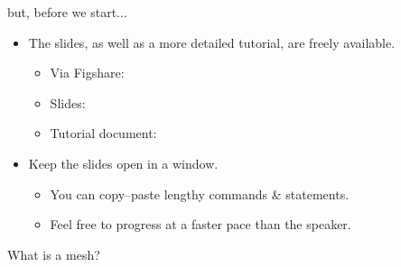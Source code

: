 \documentclass[t]{beamer}
\begin{document}
\begin{frame}{but, before we start...}
  \begin{itemize}
     \item The slides, as well as a more detailed tutorial, are freely available.\\
     \begin{itemize}
         \item Via Figshare:
         \item Slides:
         \item Tutorial document:
     \end{itemize}
     \item Keep the slides open in a window.
     \begin{itemize}
         \item You can copy--paste lengthy commands \& statements.
         \item Feel free to progress at a faster pace than the speaker.
     \end{itemize}
  \end{itemize}
\end{frame}

\begin{frame}{What is a mesh?}
\end{frame}
\end{document}

